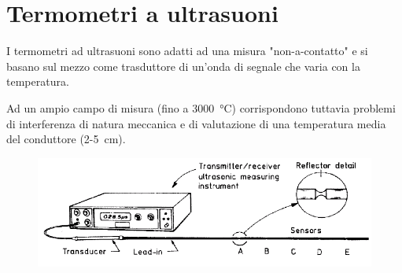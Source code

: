 \documentclass[a4paper, 15pt]{article}
\begin{document}
\section{Termometri a ultrasuoni}
\begin{adjustwidth}{2in}{}	
	I termometri ad ultrasuoni sono adatti ad una misura "non-a-contatto" e si basano sul mezzo come trasduttore di un'onda di segnale che varia con la temperatura. 
	
	Ad un ampio campo di misura (fino a \SI{3000}{\celsius}) corrispondono tuttavia problemi di interferenza di natura meccanica e di valutazione di una temperatura media del conduttore (2-5~\si{\centi\metre}).
	\begin{figure}[H]
		\centering
		\includegraphics[width=0.5\linewidth]{immagini/screenshot040}
		\label{fig:screenshot040}
	\end{figure}
\end{adjustwidth}
\end{document}
